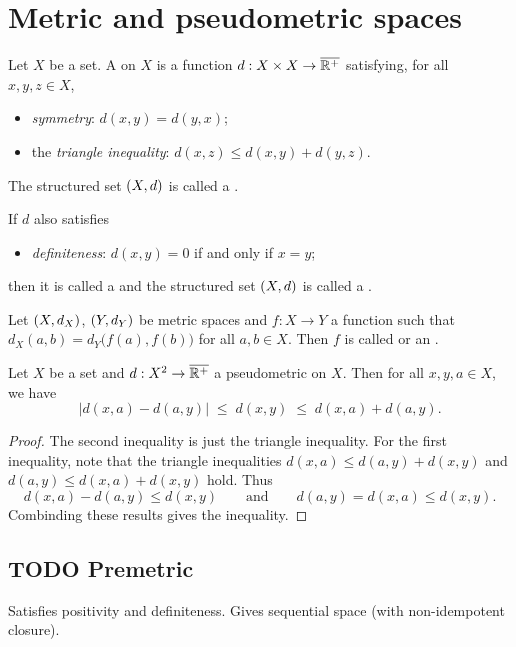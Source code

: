 \section{Metric and pseudometric spaces}
\begin{definition}
Let $X$ be a set. A  on $X$ is a function $d: X\times X\to \overline{\mathbb{R}^+}$ satisfying, for all $x,y,z\in X$,
\begin{itemize}
\item \emph{symmetry}: $d(x,y) = d(y,x)$;
\item the \emph{triangle inequality}: $d(x,z) \leq d(x,y) + d(y,z)$.
\end{itemize}
The structured set $\sSet{X,d}$ is called a .

If $d$ also satisfies
\begin{itemize}
\item \emph{definiteness}: $d(x,y) = 0$ \textup{if and only if} $x=y$;
\end{itemize}
then it is called a  and the structured set $\sSet{X,d}$ is called a .

Let $\sSet{X,d_X}$, $\sSet{Y,d_Y}$ be metric spaces and $f: X\to Y$ a function such that $d_X(a,b) = d_Y\big(f(a), f(b)\big)$ for all $a,b\in X$. Then $f$ is called  or an .
\end{definition}

\begin{lemma} \label{metricReverseTriangleInequality}
Let $X$ be a set and $d: X^2\to\overline{\mathbb{R}^+}$ a pseudometric on $X$. Then for all $x,y,a\in X$, we have
\[ \big|d(x,a) - d(a,y)\big| \;\leq\; d(x,y) \;\leq\; d(x,a) + d(a,y). \]
\end{lemma}
\begin{proof}
The second inequality is just the triangle inequality. For the first inequality, note that the triangle inequalities $d(x,a) \leq d(a,y) + d(x,y)$ and $d(a,y)\leq d(x,a) + d(x,y)$ hold. Thus
\[ d(x,a) - d(a,y) \leq d(x,y) \qquad\text{and}\qquad d(a,y) = d(x,a) \leq d(x,y). \]
Combinding these results gives the inequality.
\end{proof}

\subsection{TODO Premetric}
Satisfies positivity and definiteness. Gives sequential space (with non-idempotent closure).

